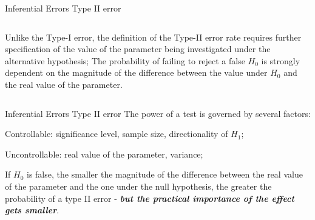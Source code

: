 \documentclass[t]{beamer}
\begin{document}
\begin{ftst}
{Inferential Errors}
{Type II error}
\begin{columns}[T]
		Unlike the Type-I error, the definition of the Type-II error rate requires further specification of the value of the parameter being investigated under the alternative hypothesis;
		\vone
		The probability of failing to reject a false $H_0$ is strongly dependent on the magnitude of the difference between the value under $H_0$ and the real value of the parameter.
	\end{columns}

\end{ftst}


\begin{ftst}
{Inferential Errors}
{Type II error}
The power of a test is governed by several factors:

\bitems Controllable: significance level, sample size, directionality of $H_1$;
	\item Uncontrollable: real value of the parameter, variance;
\eitem

If $H_0$ is false, the smaller the magnitude of the difference between the real value of the parameter and the one under the null hypothesis, the greater the probability of a type II error - \textbf{\textit{but the practical importance of the effect gets smaller}}.
\end{ftst}
\end{document}

